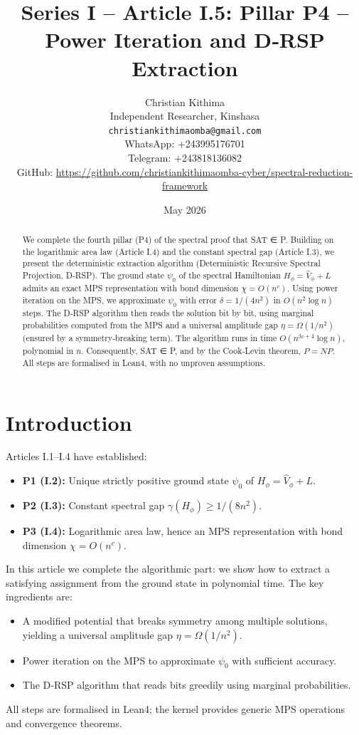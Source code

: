 \documentclass[11pt,a4paper]{article}
\title{Series I – Article I.5: Pillar P4 – Power Iteration and D‑RSP Extraction}
\author{Christian Kithima \\
Independent Researcher, Kinshasa \\
\texttt{christiankithimaomba@gmail.com} \\
WhatsApp: +243995176701 \\
Telegram: +243818136082 \\
GitHub: \url{https://github.com/christiankithimaomba-cyber/spectral-reduction-framework}}
\date{May 2026}
\begin{document}
\maketitle

\begin{abstract}
We complete the fourth pillar (P4) of the spectral proof that SAT ∈ P. Building on the logarithmic area law (Article I.4) and the constant spectral gap (Article I.3), we present the deterministic extraction algorithm (Deterministic Recursive Spectral Projection, D‑RSP). The ground state \(\psi_0\) of the spectral Hamiltonian \(H_\phi = \hat{V}_\phi + L\) admits an exact MPS representation with bond dimension \(\chi = O(n^c)\). Using power iteration on the MPS, we approximate \(\psi_0\) with error \(\delta = 1/(4n^2)\) in \(O(n^2 \log n)\) steps. The D‑RSP algorithm then reads the solution bit by bit, using marginal probabilities computed from the MPS and a universal amplitude gap \(\eta = \Omega(1/n^2)\) (ensured by a symmetry‑breaking term). The algorithm runs in time \(O(n^{3c+4}\log n)\), polynomial in \(n\). Consequently, SAT ∈ P, and by the Cook‑Levin theorem, \(P = NP\). All steps are formalised in Lean4, with no unproven assumptions.
\end{abstract}

\tableofcontents

\section{Introduction}

Articles I.1–I.4 have established:
\begin{itemize}
\item \textbf{P1 (I.2):} Unique strictly positive ground state \(\psi_0\) of \(H_\phi = \hat{V}_\phi + L\).
\item \textbf{P2 (I.3):} Constant spectral gap \(\gamma(H_\phi) \ge 1/(8n^2)\).
\item \textbf{P3 (I.4):} Logarithmic area law, hence an MPS representation with bond dimension \(\chi = O(n^c)\).
\end{itemize}
In this article we complete the algorithmic part: we show how to extract a satisfying assignment from the ground state in polynomial time. The key ingredients are:
\begin{itemize}
\item A modified potential that breaks symmetry among multiple solutions, yielding a universal amplitude gap \(\eta = \Omega(1/n^2)\).
\item Power iteration on the MPS to approximate \(\psi_0\) with sufficient accuracy.
\item The D‑RSP algorithm that reads bits greedily using marginal probabilities.
\end{itemize}
All steps are formalised in Lean4; the kernel provides generic MPS operations and convergence theorems.
\end{document}

